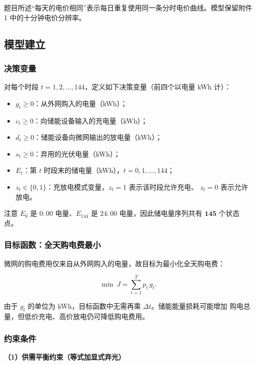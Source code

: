 \documentclass[withoutpreface,bwprint]{cumcmthesis}
\begin{document}
题目所述“每天的电价相同”表示每日重复使用同一条分时电价曲线。模型保留附件 1
中的十分钟电价分辨率。

\subsection{模型建立}

\subsubsection{决策变量}

对每个时段 $t = 1, 2, \dots, 144$，定义如下决策变量（前四个以电量 kWh 计）：

\begin{itemize}
  \item $g_t \ge 0$：从外网购入的电量（kWh）；
  \item $c_t \ge 0$：向储能设备输入的充电量（kWh）；
  \item $d_t \ge 0$：储能设备向微网输出的放电量（kWh）；
  \item $s_t \ge 0$：弃用的光伏电量（kWh）；
  \item $E_t$：第 $t$ 时段末的储电量（kWh），$t = 0, 1, \dots, 144$；
  \item $z_t \in \{0,1\}$：充放电模式变量，$z_t = 1$ 表示该时段允许充电、
        $z_t = 0$ 表示允许放电。
\end{itemize}

注意 $E_0$ 是 $0{:}00$ 电量、$E_{144}$ 是 $24{:}00$ 电量，因此储电量序列共有
$\mathbf{145}$ 个状态点。

\subsubsection{目标函数：全天购电费最小}

微网的购电费用仅来自从外网购入的电量，故目标为最小化全天购电费：

\begin{equation}
  \min\ J = \sum_{t=1}^{T} p_t\, g_t .
  \label{eq:objective}
\end{equation}

由于 $g_t$ 的单位为 kWh，目标函数中无需再乘 $\Delta t$。储能能量损耗可能增加
购电总量，但低价充电、高价放电仍可降低购电费用。

\subsubsection{约束条件}

\textbf{（1）供需平衡约束（等式加显式弃光）}
\end{document}
